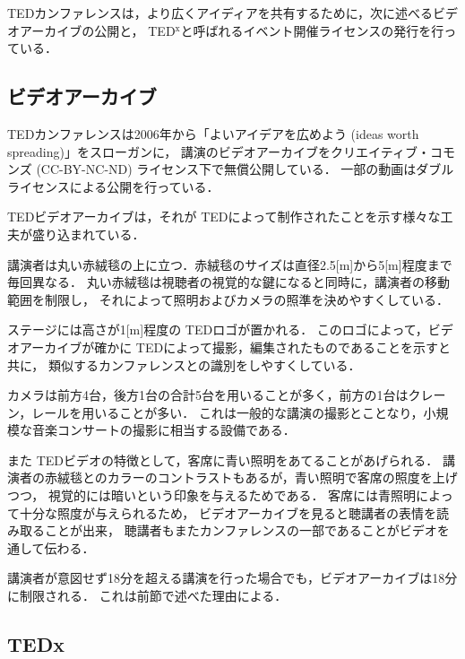 \documentclass[submit,techreq,jkeyword,noauthor]{ipsj}
\newcommand{\TED}{\textrm{TED}}
\newcommand{\TEDx}{\TED${}^{\textrm{x}}$}
\begin{document}

\TED カンファレンスは，より広くアイディアを共有するために，次に述べるビデオアーカイブの公開と，
\TEDx と呼ばれるイベント開催ライセンスの発行を行っている．

\subsection{ビデオアーカイブ}

\TED カンファレンスは2006年から「よいアイデアを広めよう (ideas worth spreading)」をスローガンに，
講演のビデオアーカイブをクリエイティブ・コモンズ (CC-BY-NC-ND) ライセンス下で無償公開している．
一部の動画はダブルライセンスによる公開を行っている．

\TED ビデオアーカイブは，それが \TED によって制作されたことを示す様々な工夫が盛り込まれている．

講演者は丸い赤絨毯の上に立つ．赤絨毯のサイズは直径2.5[m]から5[m]程度まで毎回異なる．
丸い赤絨毯は視聴者の視覚的な鍵になると同時に，講演者の移動範囲を制限し，
それによって照明およびカメラの照準を決めやすくしている．

ステージには高さが1[m]程度の \TED ロゴが置かれる．
このロゴによって，ビデオアーカイブが確かに \TED によって撮影，編集されたものであることを示すと共に，
類似するカンファレンスとの識別をしやすくしている．

カメラは前方4台，後方1台の合計5台を用いることが多く，前方の1台はクレーン，レールを用いることが多い．
これは一般的な講演の撮影とことなり，小規模な音楽コンサートの撮影に相当する設備である．

また \TED ビデオの特徴として，客席に青い照明をあてることがあげられる．
講演者の赤絨毯とのカラーのコントラストもあるが，青い照明で客席の照度を上げつつ，
視覚的には暗いという印象を与えるためである．
客席には青照明によって十分な照度が与えられるため，
ビデオアーカイブを見ると聴講者の表情を読み取ることが出来，
聴講者もまたカンファレンスの一部であることがビデオを通して伝わる．

講演者が意図せず18分を超える講演を行った場合でも，ビデオアーカイブは18分に制限される．
これは前節で述べた理由による．


\subsection{TEDx}
\end{document}
